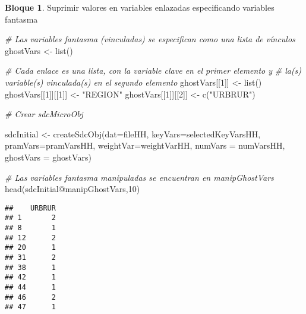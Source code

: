 \documentclass[
]{book}
\newenvironment{Shaded}{\begin{snugshade}}{\end{snugshade}}
\newcommand{\AttributeTok}[1]{\textcolor[rgb]{0.77,0.63,0.00}{#1}}
\newcommand{\CommentTok}[1]{\textcolor[rgb]{0.56,0.35,0.01}{\textit{#1}}}
\newcommand{\DecValTok}[1]{\textcolor[rgb]{0.00,0.00,0.81}{#1}}
\newcommand{\FunctionTok}[1]{\textcolor[rgb]{0.00,0.00,0.00}{#1}}
\newcommand{\NormalTok}[1]{#1}
\newcommand{\OtherTok}[1]{\textcolor[rgb]{0.56,0.35,0.01}{#1}}
\newcommand{\SpecialCharTok}[1]{\textcolor[rgb]{0.00,0.00,0.00}{#1}}
\newcommand{\StringTok}[1]{\textcolor[rgb]{0.31,0.60,0.02}{#1}}
\theoremstyle{definition}
\theoremstyle{definition}
\newtheorem{example}{Bloque}[chapter]
\theoremstyle{definition}
\theoremstyle{definition}
\theoremstyle{remark}
\begin{document}
\begin{example}
\protect\hypertarget{exm:bloque24jgm}{}\label{exm:bloque24jgm}Suprimir valores en variables enlazadas especificando variables fantasma
\end{example}

\begin{Shaded}
\begin{Highlighting}[]
\CommentTok{\# Las variables fantasma (vinculadas) se especifican como una lista de vínculos}
\NormalTok{ghostVars }\OtherTok{\textless{}{-}} \FunctionTok{list}\NormalTok{()}

\CommentTok{\# Cada enlace es una lista, con la variable clave en el primer elemento y}
\CommentTok{\# la(s) variable(s) vinculada(s) en el segundo elemento}
\NormalTok{ghostVars[[}\DecValTok{1}\NormalTok{]] }\OtherTok{\textless{}{-}} \FunctionTok{list}\NormalTok{()}
\NormalTok{ghostVars[[}\DecValTok{1}\NormalTok{]][[}\DecValTok{1}\NormalTok{]] }\OtherTok{\textless{}{-}} \StringTok{"REGION"}
\NormalTok{ghostVars[[}\DecValTok{1}\NormalTok{]][[}\DecValTok{2}\NormalTok{]] }\OtherTok{\textless{}{-}} \FunctionTok{c}\NormalTok{(}\StringTok{"URBRUR"}\NormalTok{)}

\CommentTok{\# Crear sdcMicroObj}

\NormalTok{sdcInitial }\OtherTok{\textless{}{-}} \FunctionTok{createSdcObj}\NormalTok{(}\AttributeTok{dat=}\NormalTok{fileHH, }\AttributeTok{keyVars=}\NormalTok{selectedKeyVarsHH, }\AttributeTok{pramVars=}\NormalTok{pramVarsHH, }\AttributeTok{weightVar=}\NormalTok{weightVarHH, }\AttributeTok{numVars =}\NormalTok{ numVarsHH, }\AttributeTok{ghostVars =}\NormalTok{ ghostVars)}

\CommentTok{\# Las variables fantasma manipuladas se encuentran en manipGhostVars}
\FunctionTok{head}\NormalTok{(sdcInitial}\SpecialCharTok{@}\NormalTok{manipGhostVars,}\DecValTok{10}\NormalTok{)}
\end{Highlighting}
\end{Shaded}

\begin{verbatim}
##    URBRUR
## 1       2
## 8       1
## 12      2
## 20      1
## 31      2
## 38      1
## 42      1
## 44      1
## 46      2
## 47      1
\end{verbatim}
\end{document}
